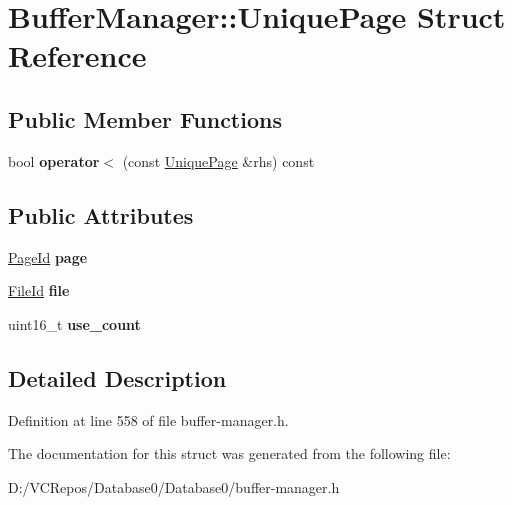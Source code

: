 \hypertarget{struct_buffer_manager_1_1_unique_page}{}\section{Buffer\+Manager\+::Unique\+Page Struct Reference}
\label{struct_buffer_manager_1_1_unique_page}
\subsection*{Public Member Functions}
\begin{DoxyCompactItemize}
\item 
\mbox{\label{struct_buffer_manager_1_1_unique_page_a8deaea0a6aa4a92ffc9646b95aee3e6d}} 
bool {\bfseries operator$<$} (const \mbox{\hyperlink{struct_buffer_manager_1_1_unique_page}{Unique\+Page}} \&rhs) const
\end{DoxyCompactItemize}
\subsection*{Public Attributes}
\begin{DoxyCompactItemize}
\item 
\mbox{\label{struct_buffer_manager_1_1_unique_page_a9ee87d3742240a0ea685dbe18e7a37b3}} 
\mbox{\hyperlink{struct_generic_i_o_id}{Page\+Id}} {\bfseries page}
\item 
\mbox{\label{struct_buffer_manager_1_1_unique_page_aa5b5bf8a83b05dbf0e6ae0f2a2964e86}} 
\mbox{\hyperlink{struct_generic_i_o_id}{File\+Id}} {\bfseries file}
\item 
\mbox{\label{struct_buffer_manager_1_1_unique_page_ae3bde658d6e5b2167dd54bd45dbe9522}} 
uint16\+\_\+t {\bfseries use\+\_\+count}
\end{DoxyCompactItemize}


\subsection{Detailed Description}


Definition at line 558 of file buffer-\/manager.\+h.



The documentation for this struct was generated from the following file\+:\begin{DoxyCompactItemize}
\item 
D\+:/\+V\+C\+Repos/\+Database0/\+Database0/buffer-\/manager.\+h\end{DoxyCompactItemize}
